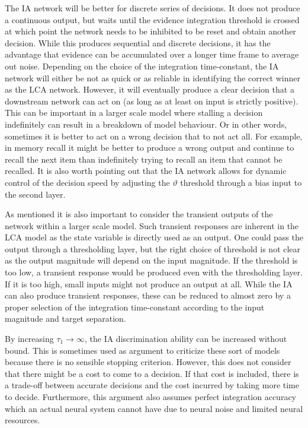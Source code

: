 The IA network will be better for discrete series of decisions.
It does not produce a continuous output, but waits until the evidence integration threshold is crossed at which point the network needs to be inhibited to be reset and obtain another decision.
While this produces sequential and discrete decisions, it has the advantage that evidence can be accumulated over a longer time frame to average out noise.
Depending on the choice of the integration time-constant, the IA network will either be not as quick or as reliable in identifying the correct winner as the LCA network.
However, it will eventually produce a clear decision that a downstream network can act on (as long as at least on input is strictly positive).
This can be important in a larger scale model where stalling a decision indefinitely can result in a breakdown of model behaviour.
Or in other words, sometimes it is better to act on a wrong decision that to not act all.
For example, in memory recall it might be better to produce a wrong output and continue to recall the next item than indefinitely trying to recall an item that cannot be recalled.
It is also worth pointing out that the IA network allows for dynamic control of the decision speed by adjusting the $\vartheta$ threshold through a bias input to the second layer.

As mentioned it is also important to consider the transient outputs of the network within a larger scale model.
Such transient responses are inherent in the LCA model as the state variable is directly used as an output.
One could pass the output through a thresholding layer, but the right choice of threshold is not clear as the output magnitude will depend on the input magnitude.
If the threshold is too low, a transient response would be produced even with the thresholding layer.
If it is too high, small inputs might not produce an output at all.
While the IA can also produce transient responses, these can be reduced to almost zero by a proper selection of the integration time-constant according to the input magnitude and target separation.

By increasing $\tau_1 \rightarrow \infty$, the IA discrimination ability can be increased without bound.
This is sometimes used as argument to criticize these sort of models \parencite[e.g.,]{Usher2001} because there is no sensible stopping criterion.
However, this does not consider that there might be a cost to come to a decision.
If that cost is included, there is a trade-off between accurate decisions and the cost incurred by taking more time to decide.
Furthermore, this argument also assumes perfect integration accuracy which an actual neural system cannot have due to neural noise and limited neural resources.

